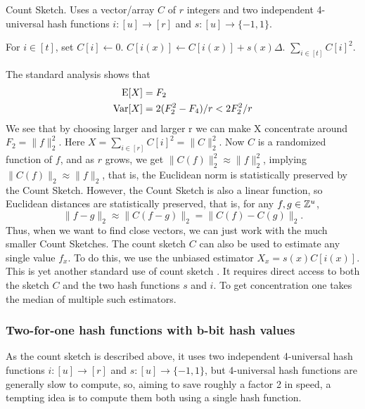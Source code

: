 \begin{algorithm}[H]
	\caption{\label{alg:count-sketch} Count Sketch. Uses a
	vector/array $C$ of $r$ integers and two independent
	4-universal hash functions $i:[u]\to[r]$ and $s:[u]\to\{-1,1\}$.
	}
	\begin{algorithmic}
		\State For $i\in[t]$, set $C[i]\gets 0$.
		\EndProcedure
		\State $C[i(x)]\gets C[i(x)]+s(x) \Delta$.
		\EndProcedure
		\State \Return $\sum_{i\in[t]} C[i]^2$.
		\EndProcedure
	\end{algorithmic}
\end{algorithm}
The standard analysis \cite{charikar04count-sketch} shows that
\begin{align}
	\operatorname*{E}[X]   & = F_2 \label{eq:E-F2}                      \\
	\operatorname*{Var}[X] & =2(F_2^2 - F_4)/r<2F_2^2/r \label{eq:V-F2}
\end{align}
We see that by choosing larger and larger r we can make X concentrate around $F_2=\|f\|^2_2$. Here
$X=\sum_{i\in[r]} C[i]^2=\|C\|^2_2$. Now $C$ is a randomized function
of $f$, and as $r$ grows, we get $\|C(f)\|^2_2\approx\|f\|^2_2$,
implying $\|C(f)\|_2\approx\|f\|_2$, that is, the Euclidean norm is
statistically preserved by the Count Sketch. However, the Count Sketch
is also a linear function, so Euclidean distances are statistically
preserved, that is, for any $f,g\in \mathbb Z^u$,
\[\|f-g\|_2\approx \|C(f-g)\|_2=\|C(f)-C(g)\|_2.\]
Thus, when we want to find close vectors, we can just work with the
much smaller Count Sketches.
The count sketch $C$ can also be used to estimate any single value $f_x$.
To do this, we use the unbiased estimator $X_x=s(x)C[i(x)]$.
This is yet another standard use of count sketch \cite{charikar04count-sketch}.
It requires direct access to both the sketch $C$ and the two hash functions $s$ and $i$.
To get concentration one takes the median of multiple such estimators.

\subsubsection{Two-for-one hash functions with b-bit hash values}
As the count sketch is described above,
it uses two independent 4-universal hash functions
$i:[u]\to[r]$ and $s:[u]\to\{-1,1\}$, but 4-universal hash functions
are generally slow to compute, so, aiming to save roughly a factor 2
in speed, a tempting idea is to compute them both using a single hash
function.


